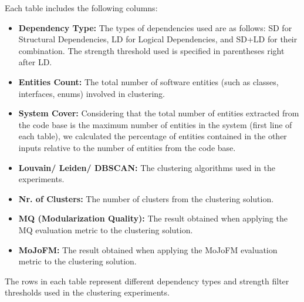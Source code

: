 \documentclass{ieeeaccess}
\begin{document}
Each table includes the following columns:
\begin{itemize}
\item \textbf{Dependency Type:} The types of dependencies used are as follows: SD for Structural Dependencies, LD for Logical Dependencies, and SD+LD for their combination. The strength threshold used is specified in parentheses right after LD.
\item \textbf{Entities Count:} The total number of software entities (such as classes, interfaces, enums) involved in clustering.
\item \textbf{System Cover:} Considering that the total number of entities extracted from the code base is the maximum number of entities in the system (first line of each table), we calculated the percentage of entities contained in the other inputs relative to the number of entities from the code base.
\item \textbf{Louvain/ Leiden/ DBSCAN:} The clustering algorithms used in the experiments.
\item \textbf{Nr. of Clusters:} The number of clusters from the clustering solution.
\item \textbf{MQ (Modularization Quality):} The result obtained when applying the MQ evaluation metric to the clustering solution.
\item \textbf{MoJoFM:} The result obtained when applying the MoJoFM evaluation metric to the clustering solution.
\end{itemize}

The rows in each table represent different dependency types and strength filter thresholds used in the clustering experiments.
\end{document}
